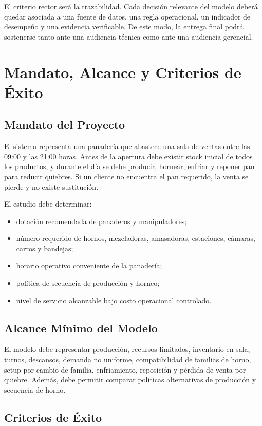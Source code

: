 \documentclass[11pt,letterpaper]{article}
\begin{document}
El criterio rector será la trazabilidad. Cada decisión relevante del modelo deberá quedar asociada a una fuente de datos, una regla operacional, un indicador de desempeño y una evidencia verificable. De este modo, la entrega final podrá sostenerse tanto ante una audiencia técnica como ante una audiencia gerencial.

\section{Mandato, Alcance y Criterios de Éxito}

\subsection{Mandato del Proyecto}

El sistema representa una panadería que abastece una sala de ventas entre las 09:00 y las 21:00 horas. Antes de la apertura debe existir stock inicial de todos los productos, y durante el día se debe producir, hornear, enfriar y reponer pan para reducir quiebres. Si un cliente no encuentra el pan requerido, la venta se pierde y no existe sustitución.

El estudio debe determinar:
\begin{itemize}
  \item dotación recomendada de panaderos y manipuladores;
  \item número requerido de hornos, mezcladoras, amasadoras, estaciones, cámaras, carros y bandejas;
  \item horario operativo conveniente de la panadería;
  \item política de secuencia de producción y horneo;
  \item nivel de servicio alcanzable bajo costo operacional controlado.
\end{itemize}

\subsection{Alcance Mínimo del Modelo}

El modelo debe representar producción, recursos limitados, inventario en sala, turnos, descansos, demanda no uniforme, compatibilidad de familias de horno, setup por cambio de familia, enfriamiento, reposición y pérdida de venta por quiebre. Además, debe permitir comparar políticas alternativas de producción y secuencia de horno.

\subsection{Criterios de Éxito}
\end{document}
